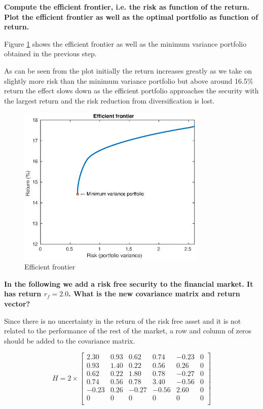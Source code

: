 \textbf{Compute the efficient frontier, i.e. the risk as function of the return. Plot the efficient frontier as well as the optimal portfolio as function of return.}

Figure \ref{fig:frontier_1} shows the efficient frontier as well as the minimum variance portfolio obtained in the previous step. 

As can be seen from the plot initially the return increases greatly as we take on slightly more risk than the minimum variance portfolio but above around 16.5\% return the effect slows down as the efficient portfolio approaches the security with the largest return and the risk reduction from diversification is lost.

\begin{figure}
    \centering
    \includegraphics[width = 0.8\textwidth]{eff_front1.eps}
    \caption{Efficient frontier}
    \label{fig:frontier_1}
\end{figure}


\textbf{In the following we add a risk free security to the financial market. It has return $r_f = 2.0$. What is the new covariance matrix and return vector?}

Since there is no uncertainty in the return of the risk free asset and it is not related to the performance of the rest of the market, a row and column of zeros should be added to the covariance matrix. 

\[H=2 \times \begin{bmatrix}
 	2.30 & 0.93 & 0.62 & 0.74 & -0.23 & 0 \\
   	0.93 & 1.40 & 0.22 & 0.56 & 0.26  & 0 \\
    0.62 & 0.22 & 1.80 & 0.78 & -0.27 & 0\\
    0.74 & 0.56 & 0.78 & 3.40 & -0.56 & 0\\
   	-0.23 & 0.26 & -0.27 & -0.56 & 2.60 & 0	\\
   	0 & 0 & 0 & 0 & 0 & 0	\\
\end{bmatrix}
\]

